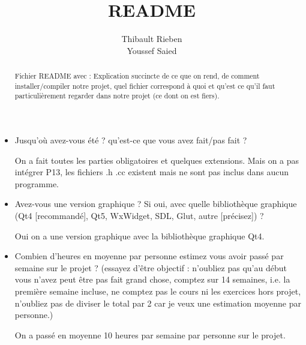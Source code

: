 \documentclass[a4paper,10pt]{article}
\title{README}
\author{Thibault Rieben \\ Youssef Saied}
\begin{document}
\maketitle

\begin{abstract}

Fichier README avec : Explication succincte de ce que on rend, de comment installer/compiler notre projet, quel fichier correspond à quoi et qu'est ce qu'il faut particulièrement regarder dans notre projet (ce dont on est fiers).

\end{abstract}


\begin{itemize}
 \item Jusqu'où avez-vous été ? qu'est-ce que vous avez fait/pas fait ?
 
 On a fait toutes les parties obligatoires et quelques extensions. Mais on a pas intégrer P13, les fichiers .h .cc existent mais ne sont pas inclus dans aucun programme.
 
 
 \item Avez-vous une version graphique ? Si oui, avec quelle bibliothèque graphique (Qt4 [recommandé], Qt5, WxWidget, SDL, Glut, autre [précisez]) ?
 
 Oui on a une version graphique avec la bibliothèque graphique Qt4.





\item Combien d'heures en moyenne par personne estimez vous avoir passé par semaine sur le projet ? (essayez d'être objectif : n'oubliez pas qu'au début vous n'avez peut être pas fait grand chose, comptez sur 14 semaines, i.e. la première semaine incluse, ne comptez pas le cours ni les exercices hors projet, n'oubliez pas de diviser le total par 2 car je veux une estimation moyenne par personne.)

On a passé en moyenne 10 heures par semaine par personne sur le projet.



\end{itemize}
\end{document}
